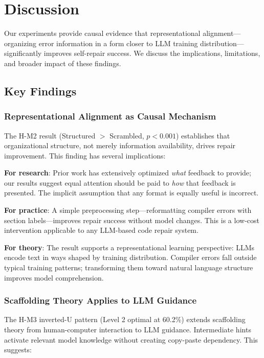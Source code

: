 \section{Discussion}

Our experiments provide causal evidence that representational alignment---organizing error information in a form closer to LLM training distribution---significantly improves self-repair success. We discuss the implications, limitations, and broader impact of these findings.

\subsection{Key Findings}

\subsubsection{Representational Alignment as Causal Mechanism}

The H-M2 result (Structured $>$ Scrambled, $p < 0.001$) establishes that organizational structure, not merely information availability, drives repair improvement. This finding has several implications:

\textbf{For research}: Prior work has extensively optimized \emph{what} feedback to provide; our results suggest equal attention should be paid to \emph{how} that feedback is presented. The implicit assumption that any format is equally useful is incorrect.

\textbf{For practice}: A simple preprocessing step---reformatting compiler errors with section labels---improves repair success without model changes. This is a low-cost intervention applicable to any LLM-based code repair system.

\textbf{For theory}: The result supports a representational learning perspective: LLMs encode text in ways shaped by training distribution. Compiler errors fall outside typical training patterns; transforming them toward natural language structure improves model comprehension.

\subsubsection{Scaffolding Theory Applies to LLM Guidance}

The H-M3 inverted-U pattern (Level 2 optimal at 60.2\%) extends scaffolding theory from human-computer interaction to LLM guidance. Intermediate hints activate relevant model knowledge without creating copy-paste dependency. This suggests:

